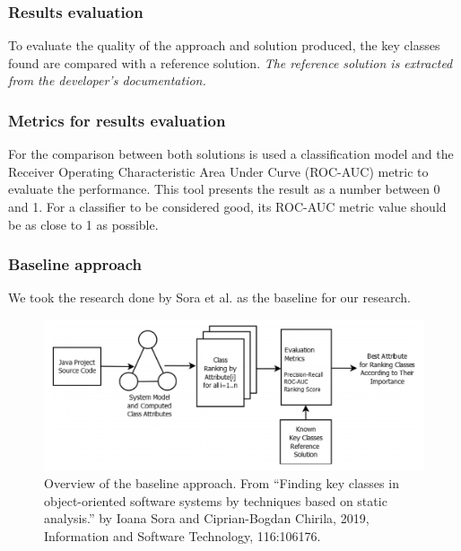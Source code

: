 \documentclass{beamer}
\begin{document}

 \begin{frame}
\frametitle{Results evaluation}
 To evaluate the quality of the approach and solution produced,
the key classes found are compared with a reference solution.
\textit{The reference solution is extracted from the developer's documentation.}
\end{frame}


 \begin{frame}
\frametitle{Metrics for results evaluation}
For the comparison between both solutions is used a classification model and the Receiver Operating Characteristic Area Under Curve (ROC-AUC) metric to evaluate the performance.
\vskip 0.3cm
 This tool presents the result as
a number between 0 and 1. For a classifier to be considered good, its ROC-AUC metric value should be as close to 1 as possible.
\end{frame}


 \begin{frame}
\frametitle{Baseline approach}
We took the research done by Sora et al. \cite{Finding-key-classes} as the baseline for our research.
 \begin{figure}[H]
\centering
\includegraphics[width=\textwidth]{baseline_approach.PNG}
\caption{Overview of the baseline approach. From “Finding key classes in object-oriented
software systems by techniques based on static analysis.” by Ioana Sora and Ciprian-Bogdan Chirila, 2019, Information and Software Technology, 116:106176.  }
\label{fig:baseline_approach}
\centering
\end{figure}

\end{frame}

\end{document}
